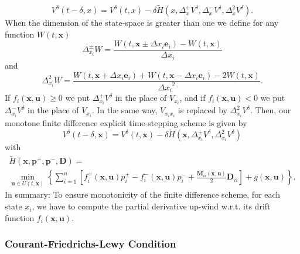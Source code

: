  \begin{equation}
 V^{\delta}(t-\delta,x)=V^{\delta}(t,x)-\delta\tilde{H}(x,\Delta^+_{x}V^{\delta},\Delta^-_{x}V^{\delta},\Delta^2_{x}V^{\delta}).
 \end{equation}
When the dimension of the state-space is greater than one we define for any function $W(t,\bm{x})$
 \begin{equation}
 \Delta^{\pm}_{x_i}W=\frac{W(t,\bm{x}\pm\Delta x_i\bm{e}_i)-W(t,\bm{x})}{\Delta x_i}
 \end{equation}
and
\begin{equation}
\Delta_{x_i}^2W=\frac{W(t,\bm{x}+\Delta x_i\bm{e}_i)+W(t,\bm{x}-\Delta x_i\bm{e}_i)-2W(t,\bm{x})}{{\Delta x_i}^2}.
\end{equation}
If $f_i(\bm{x},\bm{u})\geq0$ we put $\Delta^+_{x_i}V^{\delta}$ in the place of $V_{x_i}$, and 
if $f_i(\bm{x},\bm{u})<0$ we put $\Delta^-_{x_i}V^{\delta}$ in the place of $V_{x_i}$. In the 
same way, $V_{x_ix_i}$ is replaced by $\Delta^2_{x_i}V^{\delta}$. Then, our monotone finite 
difference explicit time-stepping scheme is given by
\begin{equation}
V^{\delta}(t-\delta,\bm{x})=V^{\delta}(t,\bm{x})-\delta\tilde{H}(\bm{x},\Delta^{\pm}_{x_i}V^{\delta},\Delta^2_{x_i}V^{\delta})
\end{equation}
with
\begin{multline}
\tilde{H}(\bm{x},\bm{p}^{+},\bm{p}^{-},\bm{D})=\\
\min_{\bm{u}\in U(t,\bm{x})}\left\{\sum_{i=1}^n\left[f^+_i(\bm{x},\bm{u})p_i^+-f_i^-(\bm{x},\bm{u})p_i^-+\frac{\bm{M}_{ii}(\bm{x},\bm{u})}{2}\bm{D}_{ii}\right]+g(\bm{x},\bm{u})\right\}.
\end{multline}
In summary: To ensure monotonicity of the finite difference scheme, for each state $x_i$, we have 
to compute the partial derivative up-wind w.r.t. its drift function $f_i(\bm{x},\bm{u})$.

 \subsubsection{Courant-Friedrichs-Lewy Condition} \label{CFL}

